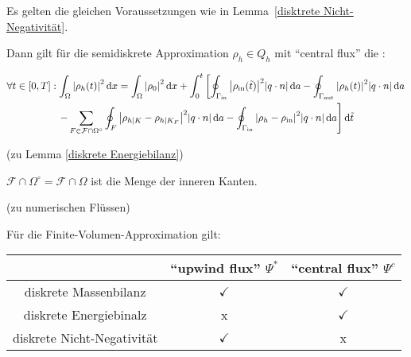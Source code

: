 \begin{Lemma} \label{diskrete Energiebilanz}	Es gelten die gleichen Voraussetzungen wie in Lemma~\ref{disktrete Nicht-Negativität}.
	
	Dann gilt für die semidiskrete Approximation $ \rho_h \in Q_h $ mit \enquote{central flux} die :
	
	\begin{gather*}
		\forall t \in [0,T]: \int_\Omega \abs{\rho_h(t)}^2 \mathop{}\!\mathrm{d} x = \int_\Omega \abs{\rho_0}^2 \mathop{}\!\mathrm{d} x + \int_{0}^{t} \left[ \oint_{\Gamma_{{\text{in}}}} \abs{\rho_{\text{in}}(\tilde{t})}^2 \abs{q \cdot n} \mathop{}\!\mathrm{d} a - \oint_{\Gamma_{{\text{out}}}} \abs{\rho_h(t)}^2 \abs{q \cdot n} \mathop{}\!\mathrm{d} a \right. \\
		\left. - \sum_{F\in \mathcal{F} \cap \Omega^\circ} \oint_F \abs{\rho_{h|K} - \rho_{h|K_F}}^2 \abs{q \cdot n} \mathop{}\!\mathrm{d} a - \oint_{\Gamma_{{\text{in}}}} \abs{\rho_h - \rho_{\text{in}}}^2 \abs{q\cdot n} \mathop{}\!\mathrm{d} a \right] \mathop{}\!\mathrm{d} \tilde{t}
	\end{gather*}
	
\end{Lemma}
 
 
 \begin{remark}(zu Lemma \ref{diskrete Energiebilanz})
 	
 	$ \mathcal{F} \cap \Omega^\circ = \mathcal{F} \cap \Omega $ ist die Menge der inneren Kanten.
 \end{remark}

\begin{remark}(zu numerischen Flüssen)
	

	Für die Finite-Volumen-Approximation gilt:

	\begin{tabular}{c || c | c}
		&\enquote{upwind flux} $ \Psi^* $ & \enquote{central flux} $ \Psi^c $  \\ \hline 
		diskrete Massenbilanz & $\checkmark$ & $\checkmark$  \\ \hline
		diskrete Energiebinalz & x  & $ \checkmark $ \\ \hline
		diskrete Nicht-Negativität & $ \checkmark $ & x  \\
	\end{tabular}
\end{remark}

